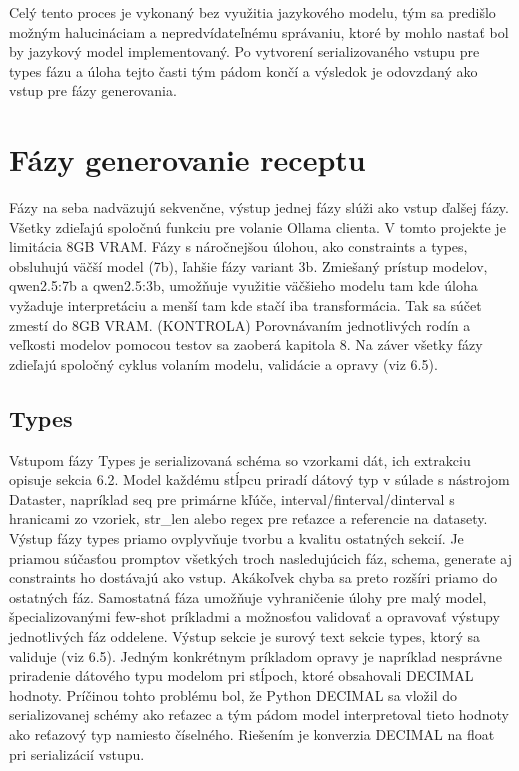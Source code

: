 Celý tento proces je vykonaný bez využitia jazykového modelu, tým sa predišlo možným halucináciam a nepredvídateľnému správaniu, ktoré by mohlo nastať bol by jazykový model implementovaný. Po vytvorení serializovaného vstupu pre types fázu a úloha tejto časti tým pádom končí a výsledok je odovzdaný ako vstup pre fázy generovania.

\section{Fázy generovanie receptu}
Fázy na seba nadväzujú sekvenčne, výstup jednej fázy slúži ako vstup ďalšej fázy. Všetky zdieľajú spoločnú funkciu pre volanie Ollama clienta. 
V tomto projekte je limitácia 8GB VRAM. Fázy s náročnejšou úlohou, ako constraints a types, obsluhujú väčší model (7b), ľahšie fázy variant 3b. Zmiešaný prístup modelov, qwen2.5:7b a qwen2.5:3b, umožňuje využitie väčšieho modelu tam kde úloha vyžaduje interpretáciu a menší tam kde stačí iba transformácia. Tak sa súčet zmestí do 8GB VRAM. (KONTROLA) Porovnávaním jednotlivých rodín a veľkosti modelov pomocou testov sa zaoberá kapitola 8. Na záver všetky fázy zdieľajú spoločný cyklus volaním modelu, validácie a opravy (viz 6.5).

\subsection{Types}
Vstupom fázy Types je serializovaná schéma so vzorkami dát, ich extrakciu opisuje sekcia 6.2. Model každému stĺpcu priradí dátový typ v súlade s nástrojom Dataster, napríklad seq pre primárne kľúče, interval/finterval/dinterval s hranicami zo vzoriek, str\_len alebo regex pre reťazce a referencie na datasety. Výstup fázy types priamo ovplyvňuje tvorbu a kvalitu ostatných sekcií. Je priamou súčasťou promptov všetkých troch nasledujúcich fáz, schema, generate aj constraints ho dostávajú ako vstup. Akákoľvek chyba sa preto rozšíri priamo do ostatných fáz. Samostatná fáza umožňuje vyhraničenie úlohy pre malý model, špecializovanými few-shot príkladmi a možnosťou validovať a opravovať výstupy jednotlivých fáz oddelene. Výstup sekcie je surový text sekcie types, ktorý sa validuje (viz 6.5). Jedným konkrétnym príkladom opravy je napríklad nesprávne priradenie dátového typu modelom pri stĺpoch, ktoré obsahovali DECIMAL hodnoty. Príčinou tohto problému bol, že Python DECIMAL sa vložil do serializovanej schémy ako reťazec a tým pádom model interpretoval tieto hodnoty ako reťazový typ namiesto číselného. Riešením je konverzia DECIMAL na float pri serializácií vstupu.

